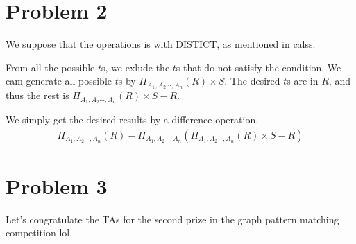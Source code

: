 \documentclass{article}
\begin{document}
\section*{Problem 2}
We suppose that the operations is with DISTICT, as mentioned in calss.

From all the possible $t$s, we exlude the $t$s that do not satisfy the condition.
We cam generate all possible $t$s by $\Pi_{A_1, A_2\cdots, A_n}(R)\times S$.
The desired $t$s are in $R$, and thus the rest is
$\Pi_{A_1, A_2\cdots, A_n}(R)\times S - R$.

We simply get the desired results by a difference operation.
\begin{align*}
	\Pi_{A_1, A_2\cdots, A_n}(R) - \Pi_{A_1, A_2\cdots, A_n}(\Pi_{A_1, A_2\cdots, A_n}(R)\times S - R)
\end{align*}

\section*{Problem 3}
Let's congratulate the TAs for the second prize in the graph pattern matching competition lol.
\end{document}
